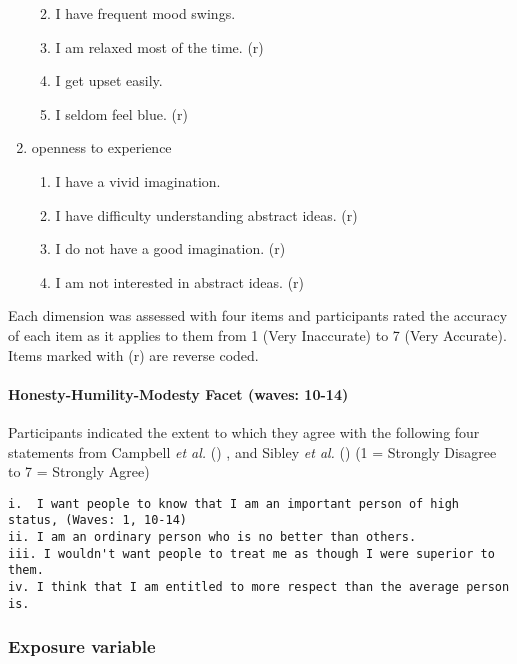 \documentclass[
  singlecolumn,
  9pt]{article}
\let\oldparagraph\paragraph
\renewcommand{\paragraph}[1]{\oldparagraph{#1}\mbox{}}
\providecommand{\tightlist}{%
  \setlength{\itemsep}{0pt}\setlength{\parskip}{0pt}}\usepackage{longtable,booktabs,array}
\begin{document}
\begin{enumerate}
  \begin{enumerate}
  \def\labelenumii{\roman{enumii}.}
  \tightlist
  \item
    I have frequent mood swings.
  \item
    I am relaxed most of the time. (r)
  \item
    I get upset easily.
  \item
    I seldom feel blue. (r)
  \end{enumerate}
\item
  openness to experience

  \begin{enumerate}
  \def\labelenumii{\roman{enumii}.}
  \tightlist
  \item
    I have a vivid imagination.
  \item
    I have difficulty understanding abstract ideas. (r)
  \item
    I do not have a good imagination. (r)
  \item
    I am not interested in abstract ideas. (r)
  \end{enumerate}
\end{enumerate}

Each dimension was assessed with four items and participants rated the
accuracy of each item as it applies to them from 1 (Very Inaccurate) to
7 (Very Accurate). Items marked with (r) are reverse coded.

\paragraph{Honesty-Humility-Modesty Facet (waves:
10-14)}\label{honesty-humility-modesty-facet-waves-10-14}

Participants indicated the extent to which they agree with the following
four statements from Campbell \emph{et al.}
() , and Sibley \emph{et al.}
() (1 = Strongly Disagree to 7 = Strongly
Agree)

\begin{verbatim}
i.  I want people to know that I am an important person of high status, (Waves: 1, 10-14)
ii. I am an ordinary person who is no better than others.
iii. I wouldn't want people to treat me as though I were superior to them.
iv. I think that I am entitled to more respect than the average person is.
\end{verbatim}

\subsubsection{Exposure variable}\label{exposure-variable}
\end{document}
